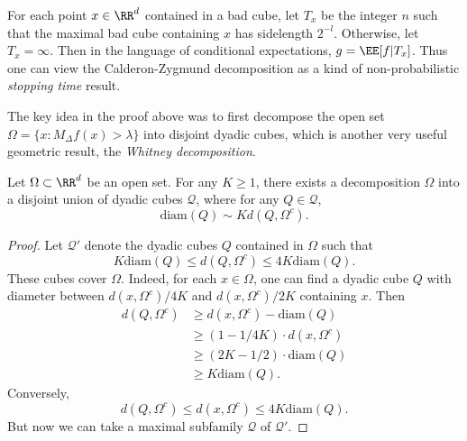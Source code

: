 \begin{remark}
    For each point $x \in \RR^d$ contained in a bad cube, let $T_x$ be the integer $n$ such that the maximal bad cube containing $x$ has sidelength $2^{-l}$. Otherwise, let $T_x = \infty$. Then in the language of conditional expectations, $g = \EE[f | T_x]$. Thus one can view the Calderon-Zygmund decomposition as a kind of non-probabilistic \emph{stopping time} result.
\end{remark}

The key idea in the proof above was to first decompose the open set $\Omega = \{ x : M_\Delta f(x) > \lambda \}$ into disjoint dyadic cubes, which is another very useful geometric result, the \emph{Whitney decomposition}.

\begin{theorem}
    Let $\Omega \subset \RR^d$ be an open set. For any $K \geq 1$, there exists a decomposition $\Omega$ into a disjoint union of dyadic cubes $\mathcal{Q}$, where for any $Q \in \mathcal{Q}$,
    \[ \text{diam}(Q) \sim K d(Q, \Omega^c). \]
\end{theorem}
\begin{proof}
    Let $\mathcal{Q}'$ denote the dyadic cubes $Q$ contained in $\Omega$ such that
    \[ K \text{diam}(Q) \leq d(Q, \Omega^c ) \leq 4K \text{diam}(Q).  \]
    These cubes cover $\Omega$. Indeed, for each $x \in \Omega$, one can find a dyadic cube $Q$ with diameter between $d(x,\Omega^c)/4K$ and $d(x,\Omega^c)/2K$ containing $x$. Then
    \begin{align*}
        d(Q,\Omega^c) &\geq d(x,\Omega^c) - \text{diam}(Q)\\
        &\geq (1 - 1/4K) \cdot d(x,\Omega^c)\\
        &\geq (2K - 1/2) \cdot \text{diam}(Q)\\
        &\geq K \text{diam}(Q).
    \end{align*}
    Conversely,
    \[ d(Q,\Omega^c) \leq d(x,\Omega^c) \leq 4K \text{diam}(Q). \]
    But now we can take a maximal subfamily $\mathcal{Q}$ of $\mathcal{Q}'$.
\end{proof}

